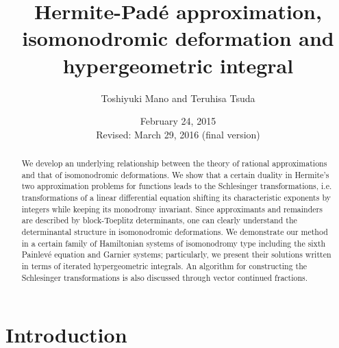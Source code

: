 \documentclass[12pt]{article}
\title{Hermite-Pad\'e approximation, isomonodromic deformation and hypergeometric integral}
\author{Toshiyuki Mano and Teruhisa Tsuda}
\date{February 24, 2015
\\
Revised: March 29, 2016 (final version)}
\numberwithin{equation}{section}
\begin{document}
\maketitle





\renewcommand{\thefootnote}{\fnsymbol{footnote}}




\begin{abstract}
We develop
an underlying relationship between the theory of rational approximations 
and that of isomonodromic deformations.
We show that
a certain duality in Hermite's two approximation problems 
for functions
leads to the Schlesinger transformations,
i.e.  transformations of a  linear differential equation
shifting its characteristic exponents by integers while keeping its monodromy 
invariant.
Since approximants 
and remainders are described by block-Toeplitz determinants,
one can clearly understand the determinantal structure in isomonodromic deformations.
We demonstrate our method in a certain family of Hamiltonian systems of isomonodromy type 
including the sixth Painlev\'e equation and Garnier systems;
particularly,  
we present their
solutions written in terms of iterated hypergeometric integrals.
An algorithm for constructing the Schlesinger transformations is also discussed through vector continued fractions.
\end{abstract}



\tableofcontents

\section*{Introduction}
\end{document}

